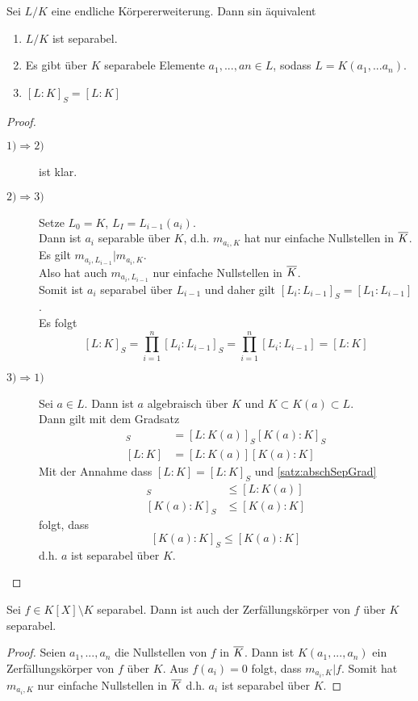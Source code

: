 	\begin{theorem}
		Sei $L/K$ eine endliche Körpererweiterung. Dann sin äquivalent
		\begin{enumerate}
			\item $L/K$ ist separabel.
			\item Es gibt über $K$ separabele Elemente $a_1,...,an\in L$, sodass $L=K(a_1,...a_n)$.
			\item $[L:K]_S=[L:K]$
		\end{enumerate}
	\end{theorem}
	\begin{proof}
		\begin{description}
			\item[$1)\Rightarrow 2)$] ist klar.
			\item[$2)\Rightarrow 3)$] Setze $L_0=K$, $L_I=L_{i-1}(a_i)$.\\
			Dann ist $a_i$ separable über $K$, d.h. $m_{a_i,K}$ hat nur einfache Nullstellen in $\overline{K}$. Es gilt $m_{a_i,L_{i-1}}|m_{a_i,K}$.\\
			Also hat auch $m_{a_i,L_{i-1}}$ nur einfache Nullstellen in $\overline{K}$.\\
			Somit ist $a_i$ separabel über $L_{i-1}$ und daher gilt $[L_i:L_{i-1}]_S=[L_1:L_{i-1}]$.\\
			Es folgt
			\[[L:K]_S=\prod_{i=1}^{n}[L_i:L_{i-1}]_S=\prod_{i=1}^{n}[L_i:L_{i-1}]=[L:K]\]
			\item[$3)\Rightarrow 1)$] Sei $a\in L$. Dann ist $a$ algebraisch über $K$ und $K\subset K(a)\subset L$.\\
			Dann gilt mit dem Gradsatz
			\begin{align*}
			[L:K]_S&=[L:K(a)]_S[K(a):K]_S\\
			[L:K]&=[L:K(a)][K(a):K]
			\end{align*}
			Mit der Annahme dass $[L:K]=[L:K]_S$ und \ref{satz:abschSepGrad}
			\begin{align*}
			[L:K(a)]_S&\leq [L:K(a)]\\
			[K(a):K]_S&\leq [K(a):K]
			\end{align*}
			folgt, dass
			\[[K(a):K]_S\leq [K(a):K]\]
			d.h. $a$ ist separabel über $K$.
		\end{description}
	\end{proof}

	\begin{satz}
		Sei $f\in K[X]\setminus K$ separabel. Dann ist auch der Zerfällungskörper von $f$ über $K$ separabel.
	\end{satz}
	\begin{proof}
		Seien $a_1,...,a_n$ die Nullstellen von $f$ in $\overline{K}$. Dann ist $K(a_1,...,a_n)$ ein Zerfällungskörper von $f$ über $K$. Aus $f(a_i)=0$ folgt, dass $m_{a_i,K}|f$. Somit hat $m_{a_i,K}$ nur einfache Nullstellen in $\overline{K}$ d.h. $a_i$ ist separabel über $K$.
	\end{proof}

